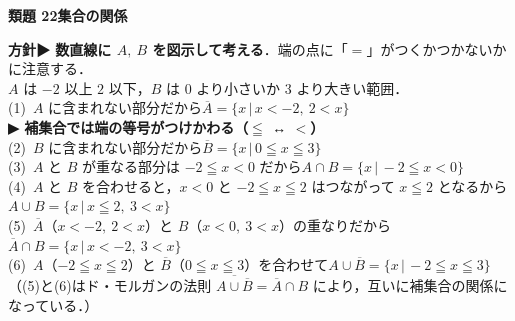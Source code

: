 \documentclass[a4paper,11pt]{ltjsarticle}
\newcommand{\ans}[2]{\Needspace{5\baselineskip}\vspace{6pt}%
  {\sffamily\bfseries 類題 #1\quad #2}\par}
\newcommand{\point}[1]{\textsf{\bfseries ▶ #1}}
\begin{document}
\ans{22}{集合の関係}
\begin{kai}
\textbf{方針}\quad \point{数直線に $A,\ B$ を図示して考える}．端の点に「$=$」がつくかつかないかに注意する．\\[2pt]
$A$ は $-2$ 以上 $2$ 以下，$B$ は $0$ より小さいか $3$ より大きい範囲．\\[2pt]
(1)\ $A$ に含まれない部分だから\quad $\overline A=\{x\,|\,x<-2,\ 2<x\}$\\
\hspace*{1.5em}\point{補集合では端の等号がつけかわる（$\leqq$ ↔ $<$）}\\[2pt]
(2)\ $B$ に含まれない部分だから\quad $\overline B=\{x\,|\,0\leqq x\leqq3\}$\\[2pt]
(3)\ $A$ と $B$ が重なる部分は $-2\leqq x<0$ だから\quad $A\cap B=\{x\,|\,-2\leqq x<0\}$\\[2pt]
(4)\ $A$ と $B$ を合わせると，$x<0$ と $-2\leqq x\leqq2$ はつながって $x\leqq2$ となるから\\
\hspace*{1.5em}$A\cup B=\{x\,|\,x\leqq2,\ 3<x\}$\\[2pt]
(5)\ $\overline A$（$x<-2,\ 2<x$）と $B$（$x<0,\ 3<x$）の重なりだから\\
\hspace*{1.5em}$\overline A\cap B=\{x\,|\,x<-2,\ 3<x\}$\\[2pt]
(6)\ $A$（$-2\leqq x\leqq2$）と $\overline B$（$0\leqq x\leqq3$）を合わせて\quad $A\cup\overline B=\{x\,|\,-2\leqq x\leqq3\}$\\[2pt]
（(5)と(6)はド・モルガンの法則 $\overline{A\cup\overline B}=\overline A\cap B$ により，互いに補集合の関係になっている．）
\end{kai}
\end{document}
